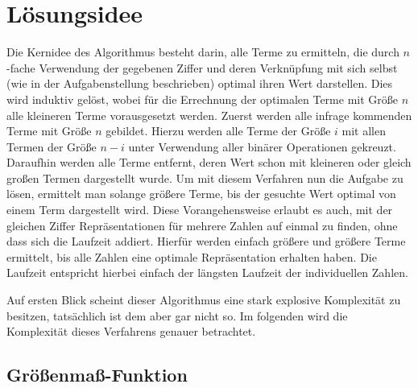 \documentclass{article}
\theoremstyle{nonumberplain}
\begin{document}

\section{Lösungsidee}

Die Kernidee des Algorithmus besteht darin, alle Terme zu ermitteln, die durch \(n\)-fache Verwendung der gegebenen Ziffer und deren Verknüpfung mit sich selbst (wie in der Aufgabenstellung beschrieben) optimal ihren Wert darstellen.
Dies wird induktiv gelöst, wobei für die Errechnung der optimalen Terme mit Größe \(n\) alle kleineren Terme vorausgesetzt werden.
Zuerst werden alle infrage kommenden Terme mit Größe \(n\) gebildet. Hierzu werden alle Terme der Größe \(i\) mit allen Termen der Größe \(n-i\) unter Verwendung aller binärer Operationen gekreuzt.
Daraufhin werden alle Terme entfernt, deren Wert schon mit kleineren oder gleich großen Termen dargestellt wurde.
Um mit diesem Verfahren nun die Aufgabe zu lösen, ermittelt man solange größere Terme, bis der gesuchte Wert optimal von einem Term dargestellt wird.
Diese Vorangehensweise erlaubt es auch, mit der gleichen Ziffer Repräsentationen für mehrere Zahlen auf einmal zu finden, ohne dass sich die Laufzeit addiert.
Hierfür werden einfach größere und größere Terme ermittelt, bis alle Zahlen eine optimale Repräsentation erhalten haben.
Die Laufzeit entspricht hierbei einfach der längsten Laufzeit der individuellen Zahlen.

Auf ersten Blick scheint dieser Algorithmus eine stark explosive Komplexität zu besitzen, tatsächlich ist dem aber gar nicht so.
Im folgenden wird die Komplexität dieses Verfahrens genauer betrachtet.

\newcommand{\fad}{\forall d, B:\ }
\newcommand{\measure}[1]{\Phi_{d}^{B}(#1)}

\subsection{Größenmaß-Funktion}
\end{document}
